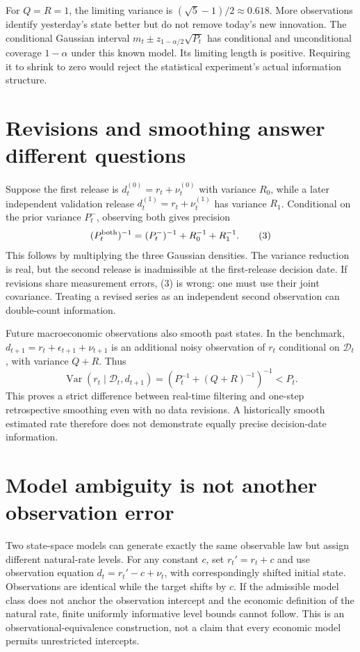 \documentclass[11pt,a4paper]{article}
\DeclareMathOperator{\Var}{Var}
\begin{document}
For $Q=R=1$, the limiting variance is $(\sqrt5-1)/2\approx0.618$. More observations identify yesterday's state better but do not remove today's new innovation. The conditional Gaussian interval $m_t\pm z_{1-\alpha/2}\sqrt{P_t}$ has conditional and unconditional coverage $1-\alpha$ under this known model. Its limiting length is positive. Requiring it to shrink to zero would reject the statistical experiment's actual information structure.

\section{Revisions and smoothing answer different questions}
Suppose the first release is $d_t^{(0)}=r_t+\nu_t^{(0)}$ with variance $R_0$, while a later independent validation release $d_t^{(1)}=r_t+\nu_t^{(1)}$ has variance $R_1$. Conditional on the prior variance $P_t^-$, observing both gives precision
\[
 (P_t^{\rm both})^{-1}=(P_t^-)^{-1}+R_0^{-1}+R_1^{-1}. \tag{3}
\]
This follows by multiplying the three Gaussian densities. The variance reduction is real, but the second release is inadmissible at the first-release decision date. If revisions share measurement errors, (3) is wrong: one must use their joint covariance. Treating a revised series as an independent second observation can double-count information.

Future macroeconomic observations also smooth past states. In the benchmark, $d_{t+1}=r_t+\epsilon_{t+1}+\nu_{t+1}$ is an additional noisy observation of $r_t$ conditional on $\mathcal D_t$, with variance $Q+R$. Thus
\[
 \Var(r_t\mid\mathcal D_t,d_{t+1})
 =\left(P_t^{-1}+(Q+R)^{-1}\right)^{-1}<P_t.
\]
This proves a strict difference between real-time filtering and one-step retrospective smoothing even with no data revisions. A historically smooth estimated rate therefore does not demonstrate equally precise decision-date information.

\section{Model ambiguity is not another observation error}
Two state-space models can generate exactly the same observable law but assign different natural-rate levels. For any constant $c$, set $r_t'=r_t+c$ and use observation equation $d_t=r_t'-c+\nu_t$, with correspondingly shifted initial state. Observations are identical while the target shifts by $c$. If the admissible model class does not anchor the observation intercept and the economic definition of the natural rate, finite uniformly informative level bounds cannot follow. This is an observational-equivalence construction, not a claim that every economic model permits unrestricted intercepts.
\end{document}
